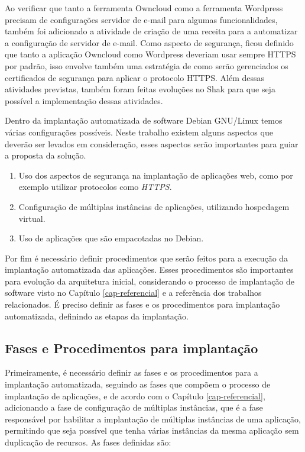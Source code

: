 Ao verificar que tanto a ferramenta Owncloud como a ferramenta Wordpress precisam
de configurações servidor de e-mail para algumas funcionalidades, também foi adicionado
a atividade de criação de uma receita para a automatizar a configuração de
servidor de e-mail. Como aspecto de segurança, ficou definido que tanto a aplicação
Owncloud como Wordpress deveriam usar sempre HTTPS por padrão, isso envolve também
uma estratégia de como serão gerenciados os certificados de segurança para aplicar
o protocolo HTTPS. Além dessas atividades previstas, também foram feitas evoluções
no Shak para que seja possível a implementação dessas atividades.

Dentro da implantação automatizada de software Debian GNU/Linux temos várias
configurações possíveis. Neste trabalho existem alguns aspectos que 
deverão ser levados em consideração, esses aspectos serão importantes para 
guiar a proposta da solução.

\begin{enumerate}
  \item  Uso dos aspectos de segurança na implantação de aplicações web,
   como por exemplo utilizar protocolos como \textit{HTTPS}.
  \item  Configuração de múltiplas instâncias de
   aplicações, utilizando hospedagem virtual.
  \item  Uso de aplicações que são empacotadas no Debian.
\end{enumerate}

Por fim é necessário definir procedimentos que serão
feitos para a execução da implantação automatizada das aplicações. Esses procedimentos são
importantes para evolução da arquitetura inicial, considerando
o processo de implantação de software visto no Capítulo \ref{cap-referencial}
e a referência dos trabalhos relacionados. É preciso definir as fases e os
procedimentos para implantação automatizada, definindo as etapas
da implantação.

\subsection{Fases e Procedimentos para implantação}
\label{sec:fases}

Primeiramente, é necessário definir as fases e os procedimentos para a implantação automatizada,
seguindo as fases que compõem o processo de implantação de aplicações, e de acordo
com o Capítulo \ref{cap-referencial}, adicionando a fase de configuração de múltiplas
instâncias, que é a fase responsável por habilitar a implantação de múltiplas 
instâncias de uma aplicação, permitindo que seja possível que 
tenha várias instâncias da mesma aplicação sem duplicação de recursos. As fases 
definidas são:

